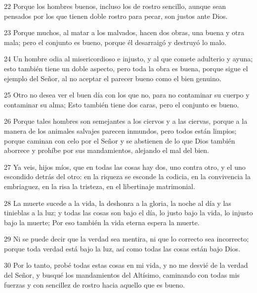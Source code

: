 \par 22 Porque los hombres buenos, incluso los de rostro sencillo, aunque sean pensados ​​por los que tienen doble rostro para pecar, son justos ante Dios.

\par 23 Porque muchos, al matar a los malvados, hacen dos obras, una buena y otra mala; pero el conjunto es bueno, porque él desarraigó y destruyó lo malo.

\par 24 Un hombre odia al misericordioso e injusto, y al que comete adulterio y ayuna; esto también tiene un doble aspecto, pero toda la obra es buena, porque sigue el ejemplo del Señor, al no aceptar el parecer bueno como el bien genuino.

\par 25 Otro no desea ver el buen día con los que no, para no contaminar su cuerpo y contaminar su alma; Esto también tiene dos caras, pero el conjunto es bueno.

\par 26 Porque tales hombres son semejantes a los ciervos y a las ciervas, porque a la manera de los animales salvajes parecen inmundos, pero todos están limpios; porque caminan con celo por el Señor y se abstienen de lo que Dios también aborrece y prohíbe por sus mandamientos, alejando el mal del bien.

\par 27 Ya veis, hijos míos, que en todas las cosas hay dos, uno contra otro, y el uno escondido detrás del otro: en la riqueza se esconde la codicia, en la convivencia la embriaguez, en la risa la tristeza, en el libertinaje matrimonial.

\par 28 La muerte sucede a la vida, la deshonra a la gloria, la noche al día y las tinieblas a la luz; y todas las cosas son bajo el día, lo justo bajo la vida, lo injusto bajo la muerte; Por eso también la vida eterna espera la muerte.

\par 29 Ni se puede decir que la verdad sea mentira, ni que lo correcto sea incorrecto; porque toda verdad está bajo la luz, así como todas las cosas están bajo Dios.

\par 30 Por lo tanto, probé todas estas cosas en mi vida, y no me desvié de la verdad del Señor, y busqué los mandamientos del Altísimo, caminando con todas mis fuerzas y con sencillez de rostro hacia aquello que es bueno.


